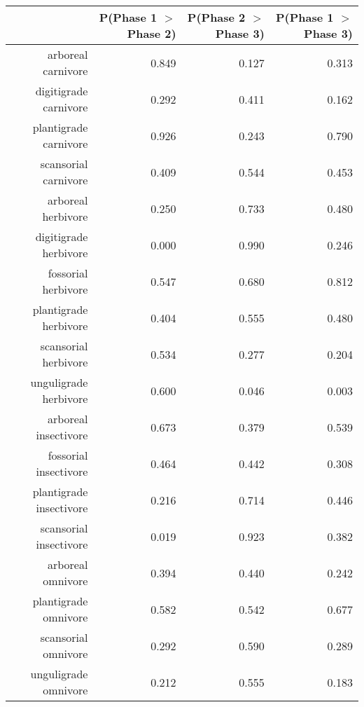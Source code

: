 \begin{table}[ht]
\centering
\begin{tabular}{rrrr}
  \hline
 & P(Phase 1 $>$ Phase 2) & P(Phase 2 $>$ Phase 3) & P(Phase 1 $>$ Phase 3) \\ 
  \hline
arboreal carnivore & 0.849 & 0.127 & 0.313 \\ 
  digitigrade carnivore & 0.292 & 0.411 & 0.162 \\ 
  plantigrade carnivore & 0.926 & 0.243 & 0.790 \\ 
  scansorial carnivore & 0.409 & 0.544 & 0.453 \\ 
  arboreal herbivore & 0.250 & 0.733 & 0.480 \\ 
  digitigrade herbivore & 0.000 & 0.990 & 0.246 \\ 
  fossorial herbivore & 0.547 & 0.680 & 0.812 \\ 
  plantigrade herbivore & 0.404 & 0.555 & 0.480 \\ 
  scansorial herbivore & 0.534 & 0.277 & 0.204 \\ 
  unguligrade herbivore & 0.600 & 0.046 & 0.003 \\ 
  arboreal insectivore & 0.673 & 0.379 & 0.539 \\ 
  fossorial insectivore & 0.464 & 0.442 & 0.308 \\ 
  plantigrade insectivore & 0.216 & 0.714 & 0.446 \\ 
  scansorial insectivore & 0.019 & 0.923 & 0.382 \\ 
  arboreal omnivore & 0.394 & 0.440 & 0.242 \\ 
  plantigrade omnivore & 0.582 & 0.542 & 0.677 \\ 
  scansorial omnivore & 0.292 & 0.590 & 0.289 \\ 
  unguligrade omnivore & 0.212 & 0.555 & 0.183 \\ 
   \hline
\end{tabular}
\label{tab:surv_plant}
\end{table}
